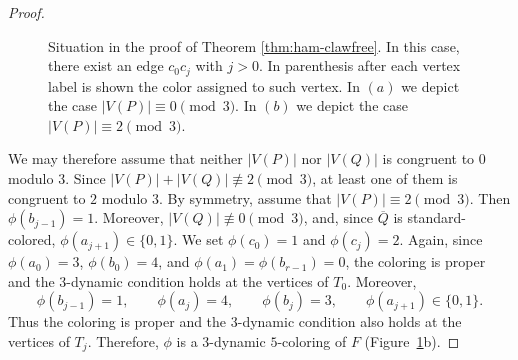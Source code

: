 \begin{proof}
\begin{figure}[H]
    \caption{Situation in the proof
    of Theorem \ref{thm:ham-clawfree}. In this case, there exist an edge $c_0c_j$ with $j>0$. In parenthesis after each
    vertex label is shown the color assigned to such vertex. In $(a)$ we depict the case $|V(P)|\equiv 0\pmod3$.
    In $(b)$ we depict the case $|V(P)|\equiv 2\pmod3$.}
    \label{fig:cubic-notconsecutive}
\end{figure}

We may therefore assume that neither $|V(P)|$ nor $|V(Q)|$ is
congruent to $0$ modulo $3$. Since
$|V(P)|+|V(Q)|\not\equiv2\pmod3$, at least one of them is congruent
to $2$ modulo $3$. By symmetry, assume that
$|V(P)|\equiv2\pmod3$.
Then $\phi(b_{j-1})=1$. Moreover, $|V(Q)|\not\equiv0\pmod3$, and,
since $\overline{Q}$ is standard-colored,
$\phi(a_{j+1})\in\{0,1\}$.
We set $\phi(c_0)=1$ and $\phi(c_j)=2$. Again, since
$\phi(a_0)=3$, $\phi(b_0)=4$, and
$\phi(a_1)=\phi(b_{r-1})=0$, the coloring is proper and the
$3$-dynamic condition holds at the vertices of $T_0$.
Moreover,
\[
\phi(b_{j-1})=1,\qquad
\phi(a_j)=4,\qquad
\phi(b_j)=3,\qquad
\phi(a_{j+1})\in\{0,1\}.
\]
Thus the coloring is proper and the $3$-dynamic condition also holds
at the vertices of $T_j$. Therefore, $\phi$ is a $3$-dynamic
$5$-coloring of $F$ (Figure~\ref{fig:cubic-notconsecutive}b).
\end{proof}